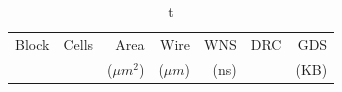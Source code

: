 \documentclass[conference]{IEEEtran}
\begin{document}
\begin{table}[t]
\caption{t}
\centering
\scriptsize
\begin{tabular}{@{}lrrrrrr@{}}
\toprule
Block & Cells & Area & Wire & WNS & DRC & GDS \\
      &       & ($\mu m^2$) & ($\mu m$) & (ns) & & (KB) \\
\midrule

\bottomrule
\end{tabular}
\end{table}
\end{document}
